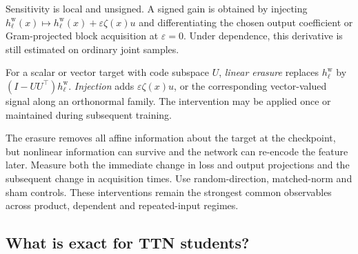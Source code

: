 Sensitivity is local and unsigned.  A signed gain is obtained by injecting
$h_\ell^{\mathrm w}(x)\mapsto h_\ell^{\mathrm w}(x)+\varepsilon\zeta(x)u$ and differentiating the
chosen output coefficient or Gram-projected block acquisition at $\varepsilon=0$.  Under dependence,
this derivative is still estimated on ordinary joint samples.

\begin{definition}\label{def:interventions}
For a scalar or vector target with code subspace $U$, \emph{linear erasure} replaces
$h_\ell^{\mathrm w}$ by $(I-UU^\top)h_\ell^{\mathrm w}$.  \emph{Injection} adds
$\varepsilon\zeta(x)u$, or the corresponding vector-valued signal along an orthonormal family.
The intervention may be applied once or maintained during subsequent training.
\end{definition}

The erasure removes all affine information about the target at the checkpoint, but nonlinear
information can survive and the network can re-encode the feature later.  Measure both the immediate
change in loss and output projections and the subsequent change in acquisition times.  Use
random-direction, matched-norm and sham controls.  These interventions remain the strongest common
observables across product, dependent and repeated-input regimes.

\subsection{What is exact for TTN students?}\label{sec:ttn-students}

